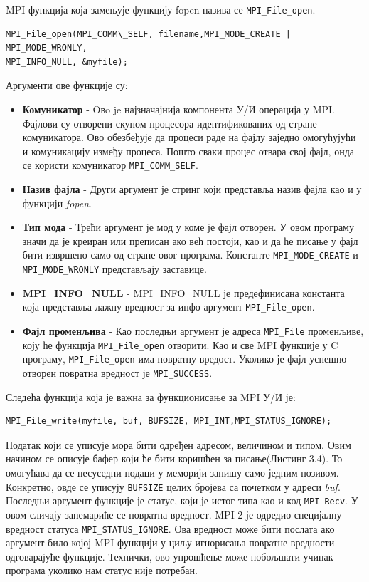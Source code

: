 MPI функција која замењује функцију fopen назива се \texttt{MPI\_File\_open}.

\begin{verbatim}
MPI_File_open(MPI_COMM\_SELF, filename,MPI_MODE_CREATE | MPI_MODE_WRONLY,
MPI_INFO_NULL, &myfile);
\end{verbatim}

Аргументи ове функције су:

\begin{itemize}
\item \textbf{Комуникатор} - Oвo je најзначајнија компонента У/И операција у MPI. Фајлови су отворени скупом процесора идентификованих од стране комуникатора. 
Ово обезбеђује да процеси раде на фајлу заједно омогућујући и комуникацију између процеса. 
Пошто сваки процес отвара свој фајл, онда се користи комуникатор \texttt{MPI\_COMM\_SELF}.

\item \textbf{Назив фајла} - Други аргумент је стринг који представља назив фајла као и у функцији \textit{fopen}.

\item \textbf{Тип мода} - Трећи аргумент је мод у коме је фајл отворен. У овом програму значи да је креиран или преписан ако већ постоји, као и да ће писање у фајл бити извршено само од стране овог програма. Константе  \texttt{MPI\_MODE\_CREATE} и \texttt{MPI\_MODE\_WRONLY} представљају заставице.

\item  \textbf{MPI\_INFO\_NULL} - MPI\_INFO\_NULL је предефинисана константа која представља лажну вредност за инфо аргумент \texttt{MPI\_File\_open}. 

\item \textbf{Фајл променљива} - Као последњи аргумент је адреса \texttt{MPI\_File} променљиве, коју ће функција  \texttt{MPI\_File\_open} отворити. Као и све MPI функције у C програму, \texttt{MPI\_File\_open} има повратну вредост. Уколико је фајл успешно отворен повратна вредност је \texttt{MPI\_SUCCESS}.

\end{itemize}
 
Следећа функција која је важна за функционисање за MPI У/И је:

 \begin{verbatim}
MPI_File_write(myfile, buf, BUFSIZE, MPI_INT,MPI_STATUS_IGNORE);
\end{verbatim}

Податак који се уписује мора бити одређен адресом, величином и типом. Овим начином се описује бафер који ће бити коришћен за писање(Листинг 3.4). То омогућава да се несуседни подаци у меморији запишу само једним позивом. Конкретно, овде се уписују 
\texttt{BUFSIZE} целих бројева са почетком у адреси \textit{buf}. Последњи аргумент функције је статус, који је истог типа као и код \texttt{MPI\_Recv}.
У овом сличају занемариће се повратна вредност. MPI-2 је одредио специјалну вредност статуса \texttt{MPI\_STATUS\_IGNORE}. Ова вредност може бити послата ако аргумент било којој MPI функцији у циљу игнорисања повратне вредности одговарајуће функције.
Технички, ово упрошћење може побољшати учинак програма уколико нам статус није потребан.

